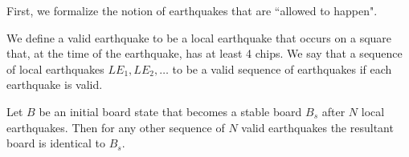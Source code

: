 \documentclass[runningheads,a4paper]{llncs}
\begin{document}
First, we formalize the notion of earthquakes that are ``allowed to happen".

\begin{definition}
We define a valid earthquake to be a local earthquake that occurs on a square that, at the time of the earthquake, has at least 4 chips. We say that a sequence of local earthquakes $LE_1, LE_2, \ldots$ to be a valid sequence of earthquakes if each earthquake is valid.
\end{definition}

\begin{theorem}
Let $B$ be an initial board state that becomes a stable board $B_s$ after $N$ local earthquakes. Then for any other sequence of $N$ valid earthquakes the resultant board is identical to $B_s$.
\end{theorem}
\end{document}

